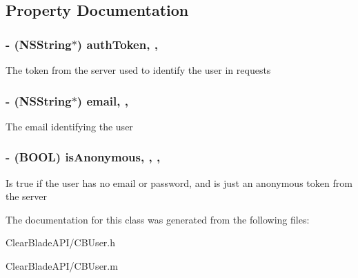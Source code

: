 \subsection{Property Documentation}
\hypertarget{interface_c_b_user_a942ca51689b5cfc7f8dc740f7543f54a}{
\subsubsection[{auth\+Token}]{\setlength{\rightskip}{0pt plus 5cm}-\/ (N\+S\+String$\ast$) auth\+Token\hspace{0.3cm}{\ttfamily [read]}, {\ttfamily [nonatomic]}, {\ttfamily [strong]}}}\label{interface_c_b_user_a942ca51689b5cfc7f8dc740f7543f54a}
The token from the server used to identify the user in requests \hypertarget{interface_c_b_user_a7907af25f66ea43d5b53ca0e70df34a2}{
\subsubsection[{email}]{\setlength{\rightskip}{0pt plus 5cm}-\/ (N\+S\+String$\ast$) email\hspace{0.3cm}{\ttfamily [read]}, {\ttfamily [nonatomic]}, {\ttfamily [strong]}}}\label{interface_c_b_user_a7907af25f66ea43d5b53ca0e70df34a2}
The email identifying the user \hypertarget{interface_c_b_user_a50094838fe6cca3581124412ed588b51}{
\subsubsection[{is\+Anonymous}]{\setlength{\rightskip}{0pt plus 5cm}-\/ (B\+O\+O\+L) is\+Anonymous\hspace{0.3cm}{\ttfamily [read]}, {\ttfamily [write]}, {\ttfamily [atomic]}, {\ttfamily [assign]}}}\label{interface_c_b_user_a50094838fe6cca3581124412ed588b51}
Is true if the user has no email or password, and is just an anonymous token from the server 

The documentation for this class was generated from the following files\+:\begin{DoxyCompactItemize}
\item 
Clear\+Blade\+A\+P\+I/C\+B\+User.\+h\item 
Clear\+Blade\+A\+P\+I/C\+B\+User.\+m\end{DoxyCompactItemize}
